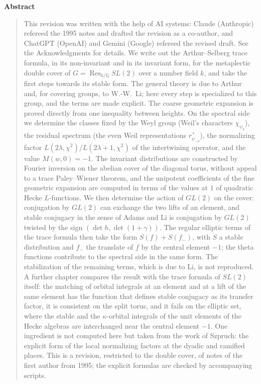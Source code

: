 \documentclass[12pt,letterpaper,openany]{book}
\numberwithin{equation}{chapter}
\theoremstyle{plain}
\theoremstyle{definition}
\theoremstyle{remark}
\theoremstyle{plain}
\newcommand{\Q}{\mathbb{Q}}
\DeclareMathOperator{\Res}{Res}
\newenvironment{abstract}%
  {\begin{center}\bfseries Abstract\end{center}\begin{quote}}%
  {\end{quote}}
\begin{document}
\begin{abstract}
This revision was written with the help of AI systems: Claude (Anthropic)
refereed the 1995 notes and drafted the revision as a co-author, and
ChatGPT (OpenAI) and Gemini (Google) refereed the revised draft. See the
Acknowledgments for details. We write out the Arthur--Selberg trace formula, in its non-invariant and
in its invariant form, for the metaplectic double cover of
$G=\Res_{k/\Q}SL(2)$ over a number field $k$, and take the first steps
towards its stable form. The general theory is due to
Arthur and, for covering groups, to W.-W.~Li; here every step is
specialized to this group, and the terms are made explicit. The coarse
geometric expansion is proved directly from one inequality between
heights. On the spectral side we determine the classes fixed by the Weyl
group (Weil's characters $\chi_{\psi_b}$), the residual spectrum (the even
Weil representations $r^+_{\psi_{-b}}$), the normalizing factor
$L(2\lambda,\chi^2)/L(2\lambda+1,\chi^2)$ of the intertwining operator,
and the value $M(w,0)=-1$. The invariant distributions are constructed by
Fourier inversion on the abelian cover of the diagonal torus, without
appeal to a trace Paley--Wiener theorem, and the unipotent coefficients
of the fine geometric expansion are computed in terms of the values at
$1$ of quadratic Hecke $L$-functions. We then determine
the action of $GL(2)$ on the cover: conjugation by $GL(2)$ can exchange
the two lifts of an element, and stable conjugacy in the sense of Adams
and Li is conjugation by $GL(2)$ twisted by the sign
$(\det h,\det(1+\gamma))$. The regular elliptic terms of the trace formula
then take the form $S(f)+S(f_-)$, with $S$ a stable distribution and
$f_-$ the translate of $f$ by the central element $-1$; the theta
functions contribute to the spectral side in the same form. The
stabilization of the remaining terms, which is due to Li, is not
reproduced. A further chapter compares the result with the trace
formula of $SL(2)$ itself: the matching of orbital integrals at an element
and at a lift of the same element has the function that defines stable
conjugacy as its transfer factor, it is consistent on the split torus,
and it fails on the elliptic set, where the stable and the
$\kappa$-orbital integrals of the unit elements of the Hecke algebras are
interchanged near the central element $-1$. One ingredient is not computed here but taken from the work of
Szpruch: the explicit form of the local normalizing factors at the dyadic
and ramified places. This is a
revision, restricted to the double cover, of notes of the first author
from 1995; the explicit formulas are checked by accompanying scripts.
\end{abstract}
\end{document}
